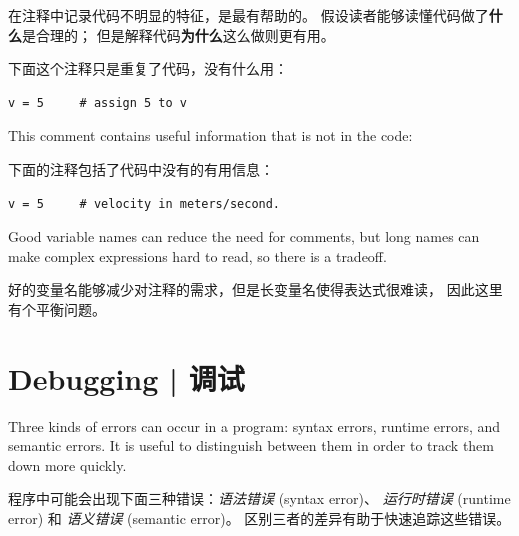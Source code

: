 在注释中记录代码不明显的特征，是最有帮助的。 假设读者能够读懂代码做了\textbf{什么}是合理的； 但是解释代码\textbf{为什么}这么做则更有用。

下面这个注释只是重复了代码，没有什么用：

\begin{lstlisting}
v = 5     # assign 5 to v
\end{lstlisting}
%
This comment contains useful information that is not in the code:

下面的注释包括了代码中没有的有用信息：

\begin{lstlisting}
v = 5     # velocity in meters/second.
\end{lstlisting}
%
Good variable names can reduce the need for comments, but
long names can make complex expressions hard to read, so there is
a tradeoff.

好的变量名能够减少对注释的需求，但是长变量名使得表达式很难读， 因此这里有个平衡问题。

%
\section{Debugging  |  调试}
  
  

Three kinds of errors can occur in a program: syntax errors, runtime
errors, and semantic errors.  It is useful
to distinguish between them in order to track them down more quickly.

程序中可能会出现下面三种错误：\emph{语法错误} (syntax error)、 \emph{运行时错误} (runtime error) 和 \emph{语义错误} (semantic error)。 区别三者的差异有助于快速追踪这些错误。

